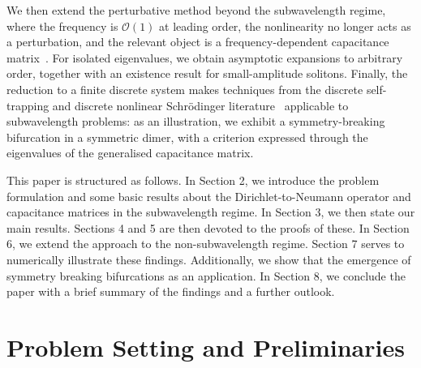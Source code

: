 \documentclass[a4paper,reqno,twoside]{amsart}
\numberwithin{equation}{section}
\theoremstyle{definition}
\newcommand{\<}{\ensuremath \leq}
\renewcommand{\>}{\ensuremath \geq}
\begin{document}
We then extend the perturbative method beyond the subwavelength regime, where
the frequency is $\mathcal{O}(1)$ at leading order, the nonlinearity no longer acts as a
perturbation, and the relevant object is a frequency-dependent capacitance
matrix~\cite{ammari2026frequency}. For isolated eigenvalues, we obtain asymptotic
expansions to arbitrary order, together with an existence result for
small-amplitude solitons.
Finally, the reduction to a finite discrete system makes techniques from the
discrete self-trapping and discrete nonlinear Schr\"odinger
literature~\cite{eilbeck1985discrete,pankov2005gap, pankov2010gap} applicable to subwavelength
problems: as an illustration, we exhibit a symmetry-breaking bifurcation in a
symmetric dimer, with a criterion expressed through the eigenvalues of the
generalised capacitance matrix.


This paper is structured as follows. In Section 2, we introduce the problem formulation and some basic results about the Dirichlet-to-Neumann operator and capacitance matrices in the subwavelength regime. In Section 3, we then state our main results. Sections 4 and 5 are then devoted to the proofs of these. In Section 6, we extend the approach to the non-subwavelength regime. Section 7 serves to numerically illustrate these findings. Additionally, we show that the emergence of symmetry breaking bifurcations as an application. In Section 8, we conclude the paper with a brief summary of the findings and a further outlook.
\section{Problem Setting and Preliminaries}\label{sec:setting}
\end{document}
